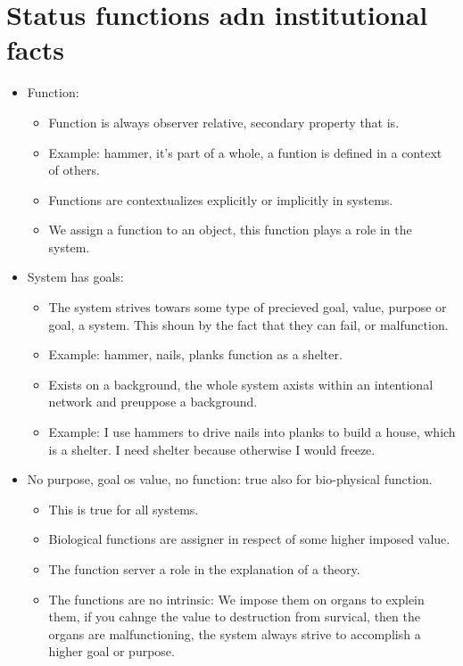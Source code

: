 \section{Status functions adn institutional facts}
\begin{itemize}
    \item Function: 
        \begin{itemize}
            \item Function is always observer relative, secondary property that is. 
            \item Example: hammer, it's part of a whole, a funtion is defined in a context of others.
            \item Functions are contextualizes explicitly or implicitly in systems.
            \item We assign a function to an object, this function plays a role  in the system.  
        \end{itemize}
    
    \item System has goals: 
        \begin{itemize}
            \item The system strives towars some type of precieved goal, value, purpose or goal, a system. This shoun by the fact that they can fail, or malfunction.
            \item Example: hammer, nails, planks function as a shelter. 
            \item Exists on a background, the whole system axists within an intentional network and preuppose a background. 
            \item Example: I use hammers to drive nails into planks to build a house, which is a shelter. I need shelter because otherwise I would freeze. 
        \end{itemize}
    
    \item No purpose, goal os value, no function: true also for bio-physical function. 
        \begin{itemize}
            \item This is true for all systems.
            \item Biological functions are assigner in respect of some higher imposed value.
            \item The function server a role in the explanation of a theory.
            \item The functions are no intrinsic: We impose them on organs to explein them, if you cahnge the value to destruction from survical, then the organs are malfunctioning, the system always strive to accomplish a higher goal or purpose.
        \end{itemize}
    

\end{itemize}
